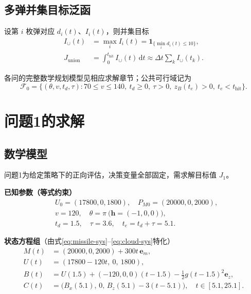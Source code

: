 \documentclass[withoutpreface,bwprint]{cumcmthesis}
\begin{document}
\subsection{多弹并集目标泛函}
设第 $i$ 枚弹对应 $d_i(t)$、$I_i(t)$，则并集目标
\begin{equation}
\begin{aligned}
I_{\cup}(t)&=\max_i I_i(t)
=\mathbf{1}_{\{\min_i d_i(t)\le 10\}},\\
J_{\mathrm{union}}
&=\int_{0}^{t_{\mathrm{hit}}} I_{\cup}(t)\,\mathrm{d}t
\approx\Delta t\sum_k I_{\cup}(t_k).
\end{aligned}
\label{eq:Junion}
\end{equation}

各问的完整数学规划模型见相应求解章节；公共可行域记为
\begin{equation}
\mathcal{F}_0=\big\{
(\theta,v,t_d,\tau):
70\le v\le 140,\ 
t_d\ge 0,\ 
\tau>0,\ 
z_B(t_e)>0,\ 
t_e<t_{\mathrm{hit}}
\big\}.
\label{eq:F0}
\end{equation}

\section{问题1的求解}

\subsection{数学模型}
问题1为给定策略下的正向评估，决策变量全部固定，需求解目标值 $J_1$。

\textbf{已知参数（等式约束）}
\begin{equation}
\begin{aligned}
&U_0=(17800,0,1800),\quad P_{M0}=(20000,0,2000),\\
&v=120,\quad \theta=\pi\ \big(\mathbf{h}=(-1,0,0)\big),\\
&t_d=1.5,\quad \tau=3.6,\quad t_e=t_d+\tau=5.1.
\end{aligned}
\label{eq:q1-param}
\end{equation}

\textbf{状态方程组}（由式\eqref{eq:missile-sys}--\eqref{eq:cloud-sys}特化）
\begin{equation}
\begin{aligned}
M(t)&=(20000,0,2000)+300t\,\mathbf{e}_m,\\
U(t)&=(17800-120t,\ 0,\ 1800),\\
B(t)&=U(1.5)+(-120,0,0)(t-1.5)-\tfrac12 g(t-1.5)^2\mathbf{e}_z,\\
C(t)&=\big(B_x(5.1),\,0,\,B_z(5.1)-3(t-5.1)\big),\quad t\in[5.1,25.1].
\end{aligned}
\label{eq:q1-state}
\end{equation}
\end{document}
